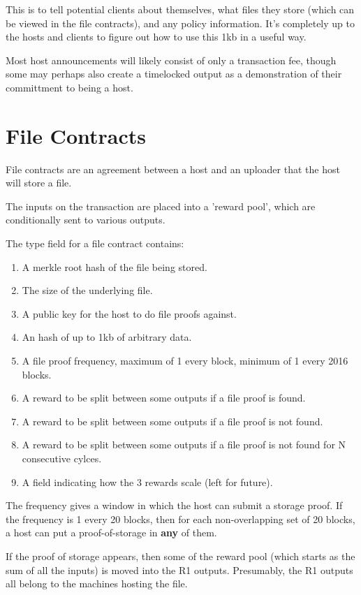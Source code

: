 \documentclass[twocolumn]{article}
\begin{document}
This is to tell potential clients about themselves, what files they store (which can be viewed in the file contracts), and any policy information.
It's completely up to the hosts and clients to figure out how to use this 1kb in a useful way.

Most host announcements will likely consist of only a transaction fee, though some may perhaps also create a timelocked output as a demonstration of their committment to being a host.

\section{File Contracts}
File contracts are an agreement between a host and an uploader that the host will store a file.

The inputs on the transaction are placed into a 'reward pool', which are conditionally sent to various outputs.

The type field for a file contract contains:
\begin{enumerate}
	\item A merkle root hash of the file being stored.
	\item The size of the underlying file.
	\item A public key for the host to do file proofs against.
	\item An hash of up to 1kb of arbitrary data.
	\item A file proof frequency, maximum of 1 every block, minimum of 1 every 2016 blocks.
	\item A reward to be split between some outputs if a file proof is found.
	\item A reward to be split between some outputs if a file proof is not found.
	\item A reward to be split between some outputs if a file proof is not found for N consecutive cylces.
	\item A field indicating how the 3 rewards scale (left for future).
\end{enumerate}

The frequency gives a window in which the host can submit a storage proof.
If the frequency is 1 every 20 blocks, then for each non-overlapping set of 20 blocks, a host can put a proof-of-storage in \textbf{any} of them.

If the proof of storage appears, then some of the reward pool (which starts as the sum of all the inputs) is moved into the R1 outputs.
Presumably, the R1 outputs all belong to the machines hosting the file.
\end{document}

